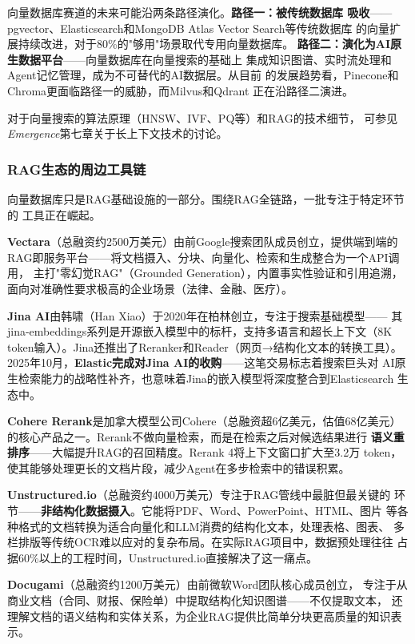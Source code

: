 向量数据库赛道的未来可能沿两条路径演化。\textbf{路径一：被传统数据库
吸收}——pgvector、Elasticsearch和MongoDB Atlas Vector Search等传统数据库
的向量扩展持续改进，对于80\%的"够用"场景取代专用向量数据库。
\textbf{路径二：演化为AI原生数据平台}——向量数据库在向量搜索的基础上
集成知识图谱、实时流处理和Agent记忆管理，成为不可替代的AI数据层。从目前
的发展趋势看，Pinecone和Chroma更面临路径一的威胁，而Milvus和Qdrant
正在沿路径二演进。

对于向量搜索的算法原理（HNSW、IVF、PQ等）和RAG的技术细节，
可参见\textit{Emergence}第七章关于长上下文技术的讨论。

\subsubsection{RAG生态的周边工具链}
向量数据库只是RAG基础设施的一部分。围绕RAG全链路，一批专注于特定环节的
工具正在崛起。

\textbf{Vectara}（总融资约2500万美元）由前Google搜索团队成员创立，提供端到端的
RAG即服务平台——将文档摄入、分块、向量化、检索和生成整合为一个API调用，
主打"零幻觉RAG"（Grounded Generation），内置事实性验证和引用追溯，
面向对准确性要求极高的企业场景（法律、金融、医疗）。

\textbf{Jina AI}由韩啸（Han Xiao）于2020年在柏林创立，专注于搜索基础模型——
其jina-embeddings系列是开源嵌入模型中的标杆，支持多语言和超长上下文（8K
token输入）。Jina还推出了Reranker和Reader（网页→结构化文本的转换工具）。
2025年10月，\textbf{Elastic完成对Jina AI的收购}——这笔交易标志着搜索巨头对
AI原生检索能力的战略性补齐，也意味着Jina的嵌入模型将深度整合到Elasticsearch
生态中。

\textbf{Cohere Rerank}是加拿大模型公司Cohere（总融资超6亿美元，估值68亿美元）
的核心产品之一。Rerank不做向量检索，而是在检索之后对候选结果进行
\textbf{语义重排序}——大幅提升RAG的召回精度。Rerank 4将上下文窗口扩大至3.2万
token，使其能够处理更长的文档片段，减少Agent在多步检索中的错误积累。

\textbf{Unstructured.io}（总融资约4000万美元）专注于RAG管线中最脏但最关键的
环节——\textbf{非结构化数据摄入}。它能将PDF、Word、PowerPoint、HTML、图片
等各种格式的文档转换为适合向量化和LLM消费的结构化文本，处理表格、图表、
多栏排版等传统OCR难以应对的复杂布局。在实际RAG项目中，数据预处理往往
占据60\%以上的工程时间，Unstructured.io直接解决了这一痛点。

\textbf{Docugami}（总融资约1200万美元）由前微软Word团队核心成员创立，
专注于从商业文档（合同、财报、保险单）中提取结构化知识图谱——不仅提取文本，
还理解文档的语义结构和实体关系，为企业RAG提供比简单分块更高质量的知识表示。

